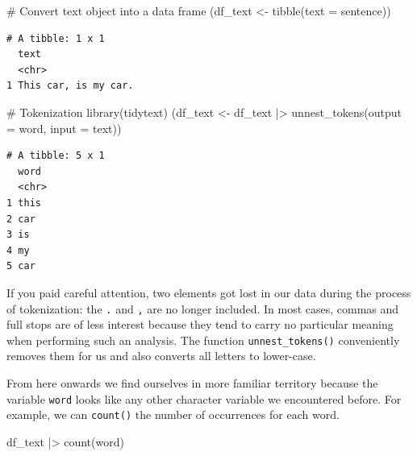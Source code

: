\documentclass[
  letterpaper,
]{krantz}
\makeatletter
\newenvironment{Shaded}{\begin{snugshade}}{\end{snugshade}}
\newcommand{\AttributeTok}[1]{\textcolor[rgb]{0.40,0.45,0.13}{#1}}
\newcommand{\CommentTok}[1]{\textcolor[rgb]{0.37,0.37,0.37}{#1}}
\newcommand{\FunctionTok}[1]{\textcolor[rgb]{0.28,0.35,0.67}{#1}}
\newcommand{\NormalTok}[1]{\textcolor[rgb]{0.00,0.23,0.31}{#1}}
\newcommand{\OtherTok}[1]{\textcolor[rgb]{0.00,0.23,0.31}{#1}}
\newcommand{\SpecialCharTok}[1]{\textcolor[rgb]{0.37,0.37,0.37}{#1}}
\newenvironment{kframe}{%
\medskip{}
\setlength{\fboxsep}{.8em}
 \def\at@end@of@kframe{}%
 \ifinner\ifhmode%
  \def\at@end@of@kframe{\end{minipage}}%
  \begin{minipage}{\columnwidth}%
 \fi\fi%
 \def\FrameCommand##1{\hskip\@totalleftmargin \hskip-\fboxsep
 \colorbox{shadecolor}{##1}\hskip-\fboxsep
     \hskip-\linewidth \hskip-\@totalleftmargin \hskip\columnwidth}%
 \MakeFramed {\advance\hsize-\width
   \@totalleftmargin\z@ \linewidth\hsize
   \@setminipage}}%
 {\par\unskip\endMakeFramed%
 \at@end@of@kframe}
\renewenvironment{Shaded}{\begin{kframe}}{\end{kframe}}
\makeatother
\begin{document}
\begin{Shaded}
\begin{Highlighting}[]
\CommentTok{\# Convert text object into a data frame}
\NormalTok{(df\_text }\OtherTok{\textless{}{-}} \FunctionTok{tibble}\NormalTok{(}\AttributeTok{text =}\NormalTok{ sentence))}
\end{Highlighting}
\end{Shaded}

\begin{verbatim}
# A tibble: 1 x 1
  text                
  <chr>               
1 This car, is my car.
\end{verbatim}

\begin{Shaded}
\begin{Highlighting}[]
\CommentTok{\# Tokenization}
\FunctionTok{library}\NormalTok{(tidytext)}
\NormalTok{(df\_text }\OtherTok{\textless{}{-}}\NormalTok{ df\_text }\SpecialCharTok{|\textgreater{}} \FunctionTok{unnest\_tokens}\NormalTok{(}\AttributeTok{output =}\NormalTok{ word,}
                                      \AttributeTok{input =}\NormalTok{ text))}
\end{Highlighting}
\end{Shaded}

\begin{verbatim}
# A tibble: 5 x 1
  word 
  <chr>
1 this 
2 car  
3 is   
4 my   
5 car  
\end{verbatim}

If you paid careful attention, two elements got lost in our data during
the process of tokenization: the \texttt{.} and \texttt{,} are no longer
included. In most cases, commas and full stops are of less interest
because they tend to carry no particular meaning when performing such an
analysis. The function \texttt{unnest\_tokens()} conveniently removes
them for us and also converts all letters to lower-case.

From here onwards we find ourselves in more familiar territory because
the variable \texttt{word} looks like any other character variable we
encountered before. For example, we can \texttt{count()} the number of
occurrences for each word.

\begin{Shaded}
\begin{Highlighting}[]
\NormalTok{df\_text }\SpecialCharTok{|\textgreater{}} \FunctionTok{count}\NormalTok{(word)}
\end{Highlighting}
\end{Shaded}
\end{document}
